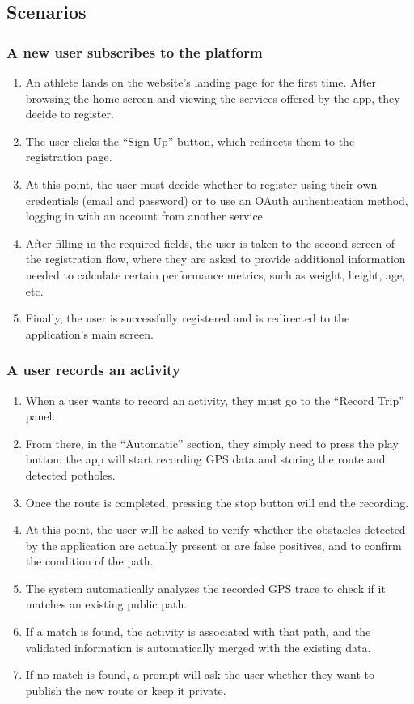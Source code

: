 \subsection{Scenarios}
\subsubsection*{A new user subscribes to the platform}
\begin{enumerate}
    \item An athlete lands on the website's landing page for the first time. After browsing the home screen and viewing the services offered by the app, they decide to register.
    \item The user clicks the “Sign Up” button, which redirects them to the registration page.
    \item At this point, the user must decide whether to register using their own credentials (email and password) or to use an OAuth authentication method, logging in with an account from another service.
    \item After filling in the required fields, the user is taken to the second screen of the registration flow, where they are asked to provide additional information needed to calculate certain performance metrics, such as weight, height, age, etc.
    \item Finally, the user is successfully registered and is redirected to the application's main screen.
\end{enumerate}
\subsubsection*{A user records an activity}

\begin{enumerate}
    \item When a user wants to record an activity, they must go to the “Record Trip” panel.
    \item From there, in the “Automatic” section, they simply need to press the play button: the app will start recording GPS data and storing the route and detected potholes.
    \item Once the route is completed, pressing the stop button will end the recording.
    \item At this point, the user will be asked to verify whether the obstacles detected by the application are actually present or are false positives, and to confirm the condition of the path.
    \item The system automatically analyzes the recorded GPS trace to check if it matches an existing public path.
    \item If a match is found, the activity is associated with that path, and the validated information is automatically merged with the existing data.
    \item If no match is found, a prompt will ask the user whether they want to publish the new route or keep it private.
\end{enumerate}

